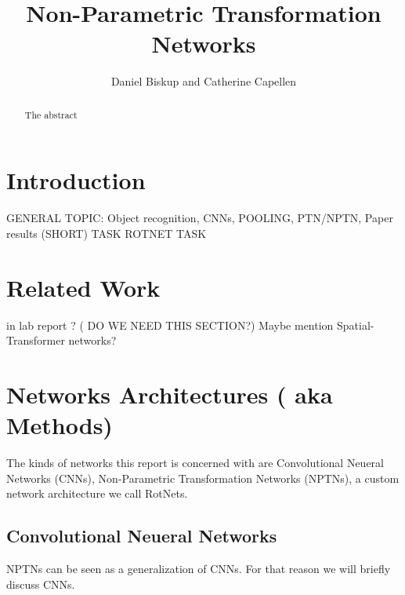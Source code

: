 \documentclass{llncs}
\begin{document}
%
\frontmatter          %
%
\pagestyle{headings}  %
%
\mainmatter              %
%
\title{Non-Parametric Transformation Networks}
%
%  
%
\author{Daniel Biskup and Catherine Capellen}
%
%
%

\maketitle              %

\begin{abstract}
The abstract 
\end{abstract}
%

\section{Introduction}
GENERAL TOPIC: Object recognition, CNNs, POOLING, PTN/NPTN, Paper results (SHORT) 
TASK
ROTNET TASK

\section{Related Work}
in lab report ? ( DO WE NEED THIS SECTION?) Maybe mention Spatial-
Transformer networks?

\section{Networks Architectures ( aka Methods)}
The kinds of networks this report is concerned with are Convolutional Neueral Networks (CNNs), Non-Parametric Transformation Networks (NPTNs), a custom network architecture we call RotNets.

\subsection{Convolutional Neueral Networks}
NPTNs can be seen as a generalization of CNNs. For that reason we will briefly discuss CNNs.
\end{document}
